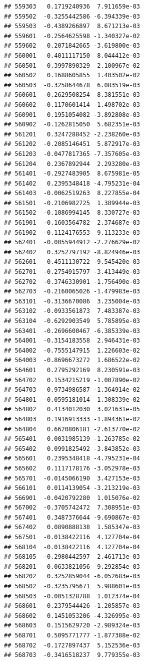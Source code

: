 \begin{frame}[fragile]
\begin{verbatim}
## 559303   0.1719240936  7.911659e-03
## 559502  -0.3255442586 -6.394339e-03
## 559503  -0.4389266897  8.671213e-03
## 559601  -0.2564625598 -1.340327e-02
## 559602   0.2071842665 -3.619800e-03
## 560001   0.4011117150  8.044412e-03
## 560501   0.3997890329  2.100967e-02
## 560502   0.1688605855  1.403502e-02
## 560503  -0.3258644678  6.083519e-03
## 560601  -0.2629508254  8.381551e-03
## 560602  -0.1170601414  1.498702e-03
## 560901   0.1951054082 -3.892808e-03
## 560902  -0.1262815050  5.682351e-03
## 561201   0.3247288452 -2.238260e-03
## 561202  -0.2085146451  5.872917e-03
## 561203  -0.0477817365 -7.357605e-03
## 561204   0.2367892944  2.293280e-03
## 561401  -0.2927483905  8.675981e-05
## 561402   0.2395348418 -4.795231e-04
## 561403  -0.0062519263  8.227855e-04
## 561501  -0.2106982725  1.389944e-03
## 561502  -0.1086994145  8.330727e-03
## 561901  -0.1603564782  2.374687e-03
## 561902  -0.1124176553  9.113233e-03
## 562401  -0.0055944912 -2.276629e-02
## 562402   0.3252797192 -8.824946e-03
## 562601   0.4511130722 -9.545420e-03
## 562701  -0.2754915797 -3.413449e-03
## 562702  -0.3746330901 -1.756490e-03
## 562703  -0.2160065026 -1.479983e-03
## 563101  -0.3136670086  3.235004e-03
## 563102  -0.0933561873  7.483387e-03
## 563104  -0.6292903549  5.785895e-03
## 563401  -0.2696600467 -6.385339e-03
## 564001  -0.3154183558  2.946431e-03
## 564002  -0.7555147915  1.226603e-02
## 564003  -0.8696673272  1.686522e-02
## 564601   0.2795292169  8.230591e-03
## 564702   0.1534215219 -1.007890e-02
## 564703   0.9734986587 -1.364914e-02
## 564801  -0.0595181014  1.308339e-02
## 564802   0.4134012030  3.021631e-05
## 564803   0.1916913333 -1.894361e-02
## 564804   0.6620806181 -2.613770e-02
## 565401   0.0031985139 -1.263785e-02
## 565402   0.0991825492 -3.843852e-03
## 565601   0.2395348418 -4.795231e-04
## 565602   0.1117178176 -3.052978e-03
## 565701  -0.0145066190  3.427153e-03
## 566101   0.0114139054 -3.213219e-03
## 566901  -0.0420792280  1.015076e-02
## 567002  -0.3705742472  7.308951e-03
## 567401   0.3487376644 -9.690867e-03
## 567402   0.0890888138  1.585347e-03
## 567501  -0.0138422116  4.127704e-04
## 568104  -0.0138422116  4.127704e-04
## 568105  -0.2980442597  2.461713e-03
## 568201   0.0633821056  9.292854e-03
## 568202   0.3252859044 -6.052683e-03
## 568502  -0.3235795671  5.988601e-03
## 568503  -0.0051328788  1.012374e-04
## 568601   0.2379544426 -1.205857e-03
## 568602   0.1451053206 -4.326995e-03
## 568603   0.1515629720 -2.989324e-03
## 568701   0.5095771777 -1.877388e-02
## 568702  -0.1727897437  5.152536e-03
## 568703  -0.3416518237  9.779355e-03

\end{verbatim}
\end{frame}
